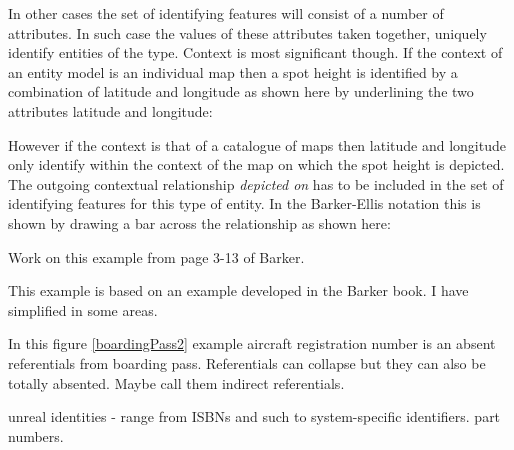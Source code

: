 \mynote In other cases the set of identifying features will consist of a number of attributes. In such case  the values of these attributes taken together, uniquely identify entities of the type. Context is most significant though. 
If the context of an entity model is an individual map then a spot height is identified by a combination of latitude and longitude as shown here by underlining the two attributes latitude and longitude: 

\begin{center}

\end{center}

However if the context is that of a catalogue of maps then latitude and longitude only identify within the context of the map on which the spot height is depicted. The outgoing contextual relationship \textit{depicted on}
has to be included in the set of identifying features for this type of entity. In the Barker-Ellis notation this is shown by drawing a bar across the relationship as shown here:  

\begin{center}

\end{center}

\mynote Work on this example from page 3-13 of Barker.

{This example is based on an example developed in the Barker book. I have simplified in some areas.}

\begin{noteforfuture}
In this figure \ref{boardingPass2} example aircraft registration number is an absent referentials from
boarding pass. Referentials can collapse but they can also be totally absented. Maybe call them indirect referentials. 
\end{noteforfuture}



\begin{noteforfuture}
unreal identities - range from ISBNs and such to system-specific identifiers. part numbers.
\end{noteforfuture}



 
